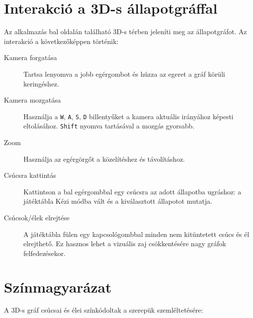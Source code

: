 \section{Interakció a 3D-s állapotgráffal}

Az alkalmazás bal oldalán található 3D-s térben jeleníti meg az állapotgráfot. Az interakció a következőképpen történik:

\begin{description}
    \item[Kamera forgatása] Tartsa lenyomva a jobb egérgombot és húzza az egeret a gráf körüli keringéshez.
    \item[Kamera mozgatása] Használja a \texttt{W}, \texttt{A}, \texttt{S}, \texttt{D} billentyűket a kamera aktuális irányához képesti eltolásához. \texttt{Shift} nyomva tartásával a mozgás gyorsabb.
    \item[Zoom] Használja az egérgörgőt a közelítéshez és távolításhoz.
    \item[Csúcsra kattintás] Kattintson a bal egérgombbal egy csúcsra az adott állapotba ugráshoz: a játéktábla Kézi módba vált és a kiválasztott állapotot mutatja.
    \item[Csúcsok/élek elrejtése] A játéktábla fülen egy kapcsológombbal minden nem kitüntetett csúcs és él elrejthető. Ez hasznos lehet a vizuális zaj csökkentésére nagy gráfok felfedezésekor.
\end{description}


\section{Színmagyarázat}
\label{sec:color-legend}

A 3D-s gráf csúcsai és élei színkódoltak a szerepük szemléltetésére:

